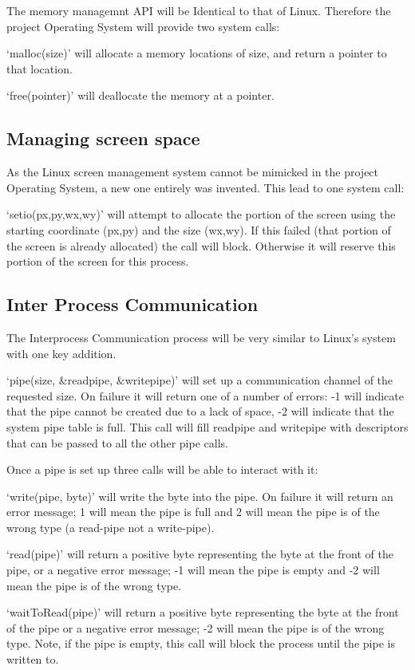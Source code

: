\documentclass[a4paper]{report}
\begin{document}
The memory managemnt API will be Identical to that of Linux. Therefore the project Operating System will provide two system calls:

`malloc(size)' will allocate a memory locations of size, and return a pointer to that location.

`free(pointer)' will deallocate the memory at a pointer.

\subsection{Managing screen space}

As the Linux screen management system cannot be mimicked in the project Operating System, a new one entirely was invented. This lead to one system call:

`setio(px,py,wx,wy)' will attempt to allocate the portion of the screen using the starting coordinate (px,py) and the size (wx,wy). If this failed (that portion of the screen is already allocated) the call will block. Otherwise it will reserve this portion of the screen for this process.


\subsection{Inter Process Communication}

The Interprocess Communication process will be very similar to Linux's system with one key addition.

`pipe(size, \&readpipe, \&writepipe)' will set up a communication channel of the requested size. On failure it will return one of a number of errors: -1 will indicate that the pipe cannot be created due to a lack of space, -2 will indicate that the system pipe table is full. This call will fill readpipe and writepipe with descriptors that can be passed to all the other pipe calls.

Once a pipe is set up three calls will be able to interact with it:

`write(pipe, byte)' will write the byte into the pipe. On failure it will return an error message; 1 will mean the pipe is full and 2 will mean the pipe is of the wrong type (a read-pipe not a write-pipe).

`read(pipe)' will return a positive byte representing the byte at the front of the pipe, or a negative error message; -1 will mean the pipe is empty and -2 will mean the pipe is of the wrong type.

`waitToRead(pipe)' will return a positive byte representing the byte at the front of the pipe or a negative error message; -2 will mean the pipe is of the wrong type. Note, if the pipe is empty, this call will block the process until the pipe is written to.
\end{document}
